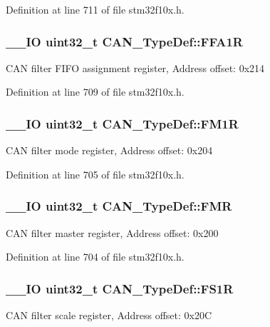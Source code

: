 Definition at line 711 of file stm32f10x.\-h.

\hypertarget{struct_c_a_n___type_def_ae2decd14b26f851e00a31b42d15293ce}{
\subsubsection[{F\-F\-A1\-R}]{\setlength{\rightskip}{0pt plus 5cm}\-\_\-\-\_\-\-I\-O {\bf uint32\-\_\-t} C\-A\-N\-\_\-\-Type\-Def\-::\-F\-F\-A1\-R}}\label{struct_c_a_n___type_def_ae2decd14b26f851e00a31b42d15293ce}
C\-A\-N filter F\-I\-F\-O assignment register, Address offset\-: 0x214 

Definition at line 709 of file stm32f10x.\-h.

\hypertarget{struct_c_a_n___type_def_aefe6a26ee25947b7eb5be9d485f4d3b0}{
\subsubsection[{F\-M1\-R}]{\setlength{\rightskip}{0pt plus 5cm}\-\_\-\-\_\-\-I\-O {\bf uint32\-\_\-t} C\-A\-N\-\_\-\-Type\-Def\-::\-F\-M1\-R}}\label{struct_c_a_n___type_def_aefe6a26ee25947b7eb5be9d485f4d3b0}
C\-A\-N filter mode register, Address offset\-: 0x204 

Definition at line 705 of file stm32f10x.\-h.

\hypertarget{struct_c_a_n___type_def_a1a6a0f78ca703a63bb0a6b6f231f612f}{
\subsubsection[{F\-M\-R}]{\setlength{\rightskip}{0pt plus 5cm}\-\_\-\-\_\-\-I\-O {\bf uint32\-\_\-t} C\-A\-N\-\_\-\-Type\-Def\-::\-F\-M\-R}}\label{struct_c_a_n___type_def_a1a6a0f78ca703a63bb0a6b6f231f612f}
C\-A\-N filter master register, Address offset\-: 0x200 

Definition at line 704 of file stm32f10x.\-h.

\hypertarget{struct_c_a_n___type_def_ac6296402924b37966c67ccf14a381976}{
\subsubsection[{F\-S1\-R}]{\setlength{\rightskip}{0pt plus 5cm}\-\_\-\-\_\-\-I\-O {\bf uint32\-\_\-t} C\-A\-N\-\_\-\-Type\-Def\-::\-F\-S1\-R}}\label{struct_c_a_n___type_def_ac6296402924b37966c67ccf14a381976}
C\-A\-N filter scale register, Address offset\-: 0x20\-C 

